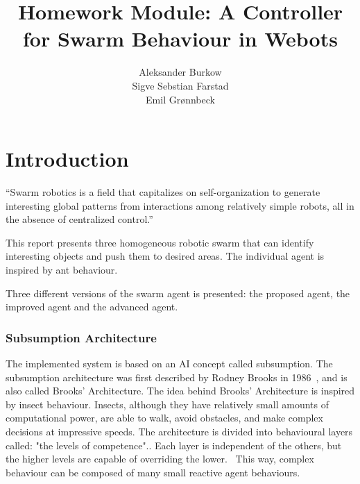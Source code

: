 \documentclass[a4paper]{article}
\title{Homework Module: A Controller for Swarm Behaviour in Webots}
\author{
    Aleksander Burkow \\
    Sigve Sebstian Farstad \\
    Emil Grønnbeck
}
\begin{document}

\maketitle
\thispagestyle{empty}


\newpage

\tableofcontents

\newpage
\setcounter{page}{1}

\part*{Introduction}
\label{part:proposed-system}

``Swarm robotics is a field that capitalizes on self-organization to generate interesting global patterns from interactions among relatively simple robots, all in the absence of centralized control.''~\cite{course-page}

This report presents three homogeneous robotic swarm that can identify interesting objects and push them to desired areas.
The individual agent is inspired by ant behaviour.

Three different versions of the swarm agent is presented: the proposed agent, the improved agent and the advanced agent.



\section{Subsumption Architecture}
The implemented system is based on an AI concept called subsumption.
The subsumption architecture was first described by Rodney Brooks in 1986~\cite{brooks}, and is also called Brooks' Architecture.
The idea behind Brooks' Architecture is inspired by insect behaviour.
Insects, although they have relatively small amounts of computational power, are able to walk, avoid obstacles, and make complex decisions at impressive speeds.
The architecture is divided into behavioural layers called: "the levels of competence".\cite{mwarnerwu}.
Each layer is independent of the others, but the higher levels are capable of overriding the lower.~\cite{mwarnerwu}
This way, complex behaviour can be composed of many small reactive agent behaviours.
\end{document}
